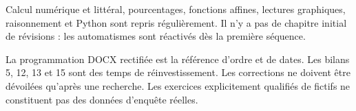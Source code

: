 \begin{keypoint}
Calcul numérique et littéral, pourcentages, fonctions affines, lectures graphiques, raisonnement et Python sont repris régulièrement. Il n'y a pas de chapitre initial de révisions : les automatismes sont réactivés dès la première séquence.
\end{keypoint}
\begin{teachernote}La programmation DOCX rectifiée est la référence d'ordre et de dates. Les bilans 5, 12, 13 et 15 sont des temps de réinvestissement. Les corrections ne doivent être dévoilées qu'après une recherche. Les exercices explicitement qualifiés de fictifs ne constituent pas des données d'enquête réelles.\end{teachernote}
\tableofcontents
